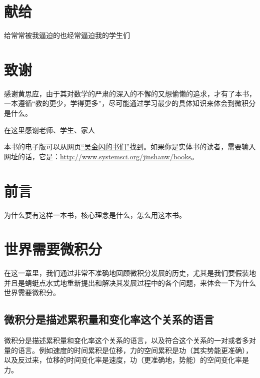 \documentclass{ctexbook}
\newcommand{\ChapLabel}[1]{\label{#1}}
\begin{document}
\tableofcontents




\chapter*{献给}

\hspace{4cm}
给常常被我逼迫的也经常逼迫我的学生们

                
     
\chapter*{致谢}

感谢黄思应，由于其对数学的严肃的深入的不懈的又想偷懒的追求，才有了本书，一本遵循“教的更少，学得更多”，尽可能通过学习最少的具体知识来体会到微积分是什么。

在这里感谢老师、学生、家人

本书的电子版可以从网页\href{http://www.systemsci.org/jinshanw/books}{“吴金闪的书们”}找到。如果你是实体书的读者，需要输入网址的话，它是：\href{http://www.systemsci.org/jinshanw/books}{http://www.systemsci.org/jinshanw/books}。

\chapter*{前言}

为什么要有这样一本书，核心理念是什么，怎么用这本书。

\chapter{世界需要微积分}
\ChapLabel{Chap:Needs}
在这一章里，我们通过非常不准确地回顾微积分发展的历史，尤其是我们要假装地并且是蜻蜓点水式地重新提出和解决其发展过程中的各个问题，来体会一下为什么世界需要微积分。


\section{微积分是描述累积量和变化率这个关系的语言}
微积分是描述累积量和变化率这个关系的语言，以及符合这个关系的一对或者多对量的语言。例如速度的时间累积是位移，力的空间累积是功（其实势能更准确），以及反过来，位移的时间变化率是速度，功（更准确地，势能）的空间变化率是力。
\end{document}
